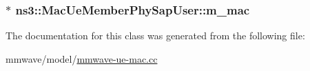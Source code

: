 \subsubsection[{\texorpdfstring{m\+\_\+mac}{m_mac}}]{$\ast$ ns3\+::\+Mac\+Ue\+Member\+Phy\+Sap\+User\+::m\+\_\+mac\hspace{0.3cm}{\ttfamily [private]}}\hypertarget{classns3_1_1MacUeMemberPhySapUser_ae48b03840eee924a75f4e0a5cb4f4929}{}\label{classns3_1_1MacUeMemberPhySapUser_ae48b03840eee924a75f4e0a5cb4f4929}


The documentation for this class was generated from the following file\+:\begin{DoxyCompactItemize}
\item 
mmwave/model/\hyperlink{mmwave-ue-mac_8cc}{mmwave-\/ue-\/mac.\+cc}\end{DoxyCompactItemize}
